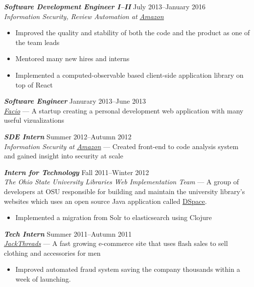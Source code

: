 \documentclass[line,letterpaper]{resume}
\begin{document}
\begin{resume}
    {\sl\textbf{Software Development Engineer I--II}} \hfill July 2013--January
    2016\\
    \emph{Information Security, Review Automation at
    \underline{\href{http://www.amazon.com/}{Amazon}}}
    \begin{itemize}
        \item Improved the quality and stability of both the code and the
            product as one of the team leads
        \item Mentored many new hires and interns
        \item Implemented a computed-observable based client-side application
            library on top of React
    \end{itemize}
    \vspace{-6pt}

    {\sl\textbf{Software Engineer}} \hfill Janurary 2013--June 2013\\
    \emph{\underline{\href{http://www.facio.com/}{Facio}}} ---
    A startup creating a personal development web application with many
    useful vizualizations
    \vspace{-6pt}

    {\sl\textbf{SDE Intern}} \hfill Summer 2012--Autumn 2012\\
    \emph{Information Security at
    \underline{\href{http://www.amazon.com/}{Amazon}}} --- Created front-end to
    code analysis system and gained insight into security at scale
    \vspace{-6pt}

    {\sl\textbf{Intern for Technology}} \hfill Fall 2011--Winter 2012\\
    \emph{The Ohio State University Libraries Web Implementation Team} --- A
    group of developers at OSU responsible for building and maintain the
    university library's websites which uses an open source Java application
    called
    \underline{\href{https://github.com/osulibraries/DSpaceOSUKB/wiki}{DSpace}}.
    \begin{itemize}
        \item Implemented a migration from Solr to elasticsearch using Clojure
    \end{itemize}
    \vspace{-6pt}

    {\sl\textbf{Tech Intern}} \hfill Summer 2011--Autumn 2011\\
    \emph{\underline{\href{http://www.jackthreads.com/}{JackThreads}}}
    --- A fast growing e-commerce site that uses flash sales to sell clothing and
    accessories for men
    \begin{itemize}
        \item Improved automated fraud system saving the company
            thousands within a week of launching.
    \end{itemize}
    \vspace{-6pt}


\end{resume}
\end{document}
